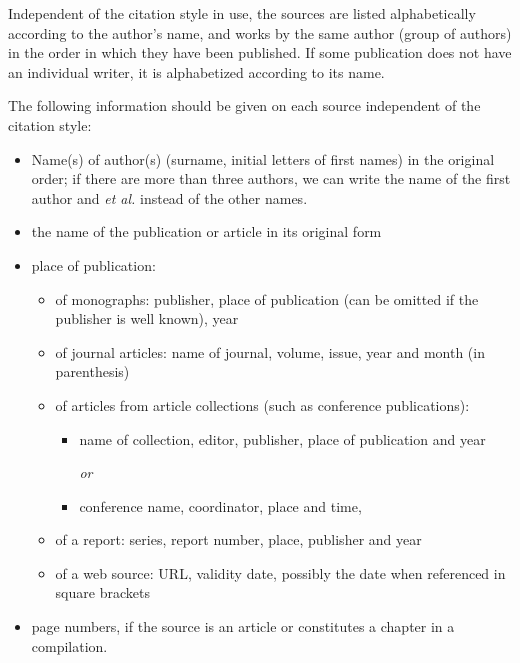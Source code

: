Independent of the citation style in use, 
the sources are listed alphabetically according to the author's name, and works by the same 
author (group of authors) in the order in which they have been published. If some publication 
does not have an individual writer, it is alphabetized according to its name.


The following information should be given on each source independent of
the citation style:
\begin{itemize}
\item
Name(s) of author(s) (surname, initial letters of first names) in the original order; if there are more 
than three authors, we can write the name of the first author and {\em et al.} instead of the other names.

\item
the name of the publication or article in its original form

\item
place of publication:

\begin{itemize}

\item
of monographs: publisher, place of publication (can be omitted if the publisher is well known), year
\item
of journal articles: name of journal, volume, issue, year and month (in parenthesis)

\item
of articles from article collections (such as conference publications):
\begin{itemize}

\item name of collection, editor, publisher, place of publication and year 

{\em or}

\item conference name, coordinator, place and time,

\end{itemize}

\item
of a report: series, report number, place, publisher and year

\item
of a web source: URL, validity date, possibly the date when referenced in square brackets

\end{itemize}

\item
page numbers, if the source is an article or constitutes a chapter in a compilation.
\end{itemize}


